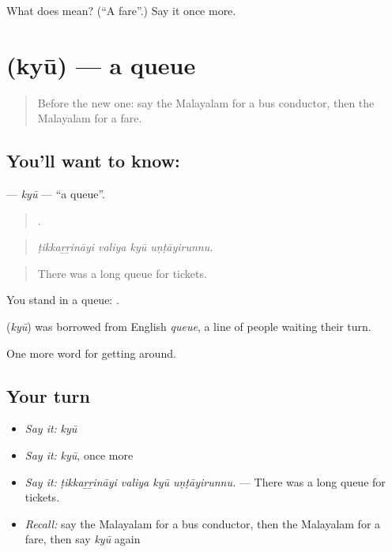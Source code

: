 \begin{tcolorbox}[breakable,colback=teal!4,colframe=teal!35!black,title={Before you move on}]
What does  mean? (\textquotedblleft{}A fare\textquotedblright{}.) Say it once more.
\end{tcolorbox}
\section[\texorpdfstring{\ml{ക്യൂ} (kyū)}{ക്യൂ (kyū)}]{ (kyū) — a queue}

\label{lesson:ML-C461-kyu}



\begin{quote}
Before the new one: say the Malayalam for a bus conductor, then the Malayalam for a fare.
\end{quote}

\subsection*{You'll want to know: }
\textbf{} — \emph{kyū} — \textquotedblleft{}a queue\textquotedblright{}.

\begin{quote}
   .
\end{quote}

\begin{quote}
\emph{ṭikkaṟṟināyi valiya kyū uṇṭāyirunnu.}
\end{quote}

\begin{quote}
There was a long queue for tickets.
\end{quote}

You stand in a queue:  .

\begin{cousinweb}
\textbf{} (\emph{kyū}) was borrowed from English \emph{queue}, a line of people waiting their turn.
\end{cousinweb}

\begin{grammarlens}[title={What you've built}]
One more word for getting around.
\end{grammarlens}

\subsection*{Your turn}
\begin{itemize}
\raggedright
  \item \emph{Say it:} \emph{kyū}
  \item \emph{Say it:} \emph{kyū}, once more
  \item \emph{Say it:} \emph{ṭikkaṟṟināyi valiya kyū uṇṭāyirunnu.} — There was a long queue for tickets.
  \item \emph{Recall:} say the Malayalam for a bus conductor, then the Malayalam for a fare, then say \emph{kyū} again
\end{itemize}

